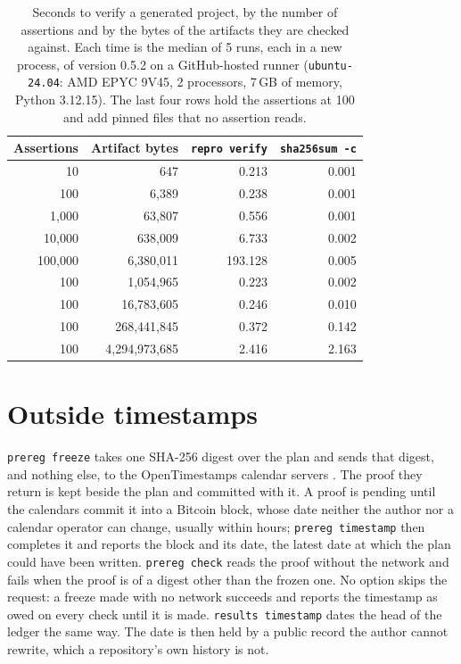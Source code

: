 \documentclass{article}
\newcommand{\code}[1]{\texttt{#1}}
\newcommand{\tVerifyCmd}{\code{repro verify}}
\begin{document}
\begin{table}[H]
\centering
\small
\caption{Seconds to verify a generated project, by the number of assertions and by the bytes of
the artifacts they are checked against. Each time is the median of 5 runs, each in a new process,
of version 0.5.2 on a GitHub-hosted runner (\code{ubuntu-24.04}: AMD EPYC 9V45, 2 processors,
7\,GB of memory, Python 3.12.15). The last four rows hold the assertions at 100 and add pinned
files that no assertion reads.}
\label{tab:timing}
\begin{tabular}{@{}rrrr@{}}
\toprule
\textbf{Assertions} & \textbf{Artifact bytes} & \textbf{\tVerifyCmd{}} & \textbf{\code{sha256sum -c}} \\
\midrule
10 & 647 & 0.213 & 0.001 \\
100 & 6{,}389 & 0.238 & 0.001 \\
1{,}000 & 63{,}807 & 0.556 & 0.001 \\
10{,}000 & 638{,}009 & 6.733 & 0.002 \\
100{,}000 & 6{,}380{,}011 & 193.128 & 0.005 \\
\midrule
100 & 1{,}054{,}965 & 0.223 & 0.002 \\
100 & 16{,}783{,}605 & 0.246 & 0.010 \\
100 & 268{,}441{,}845 & 0.372 & 0.142 \\
100 & 4{,}294{,}973{,}685 & 2.416 & 2.163 \\
\bottomrule
\end{tabular}
\end{table}



\section{Outside timestamps}
\label{sec:timestamps}

\code{prereg freeze} takes one SHA-256 digest over the plan and sends that digest, and nothing
else, to the OpenTimestamps calendar servers \citep{todd2016opentimestamps}. The proof they return
is kept beside the plan and committed with it. A proof is pending until the calendars commit it
into a Bitcoin block, whose date neither the author nor a calendar operator can change, usually
within hours; \code{prereg timestamp} then completes it and reports
the block and its date, the latest date at which the plan could have been written.
\code{prereg check} reads the proof without the network and fails when the proof is of a digest
other than the frozen one. No option skips the request: a freeze made with no network succeeds and
reports the timestamp as owed on every check until it is made. \code{results timestamp} dates the
head of the ledger the same way. The date is then held by a public record the author cannot
rewrite, which a repository's own history is not.



\clearpage

\end{document}
